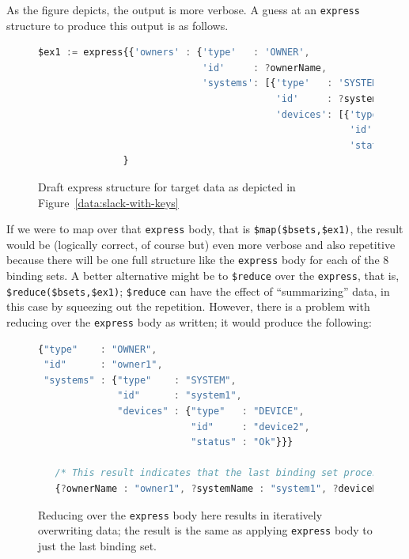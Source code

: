 \documentclass[9pt,letterpaper]{article}
\newcommand{\stt}[1]{\texttt{#1}} %
\begin{document}
As the figure depicts, the output is more verbose. %
A guess at an \stt{express} structure to produce this output is as follows.
\begin{figure}[H]
  \caption{Draft express structure for target data as depicted in Figure~\ref{data:slack-with-keys}}
 \label{code:slack-possible-express}
\begin{lstlisting}[language=JavaScript,basicstyle=\ttfamily\scriptsize,numberstyle=\scriptsize]
$ex1 := express{{'owners' : {'type'   : 'OWNER',
                             'id'     : ?ownerName,
                             'systems': [{'type'   : 'SYSTEM',
                                          'id'     : ?systemName,
                                          'devices': [{'type'  : 'DEVICE',
                                                       'id'    : ?deviceName,
                                                       'status': ?status}]}]}}
               }
\end{lstlisting}
\end{figure}  \vspace{-2em}

If we were to map over that \stt{express} body, that is \stt{\$map(\$bsets,\$ex1)}, the result would be (logically correct, of course but) even more verbose and also repetitive because there will be one full structure like the \stt{express} body for each of the 8 binding sets.
A better alternative might be to \stt{\$reduce} over the \stt{express}, that is, \stt{\$reduce(\$bsets,\$ex1)};
\stt{\$reduce} can have the effect of ``summarizing'' data, in this case by squeezing out the repetition.
However, there is a problem with reducing over the \stt{express} body as written;
it would produce the following:

\begin{figure}[H]
  \caption{Reducing over the \stt{express} body here results in iteratively overwriting data; the result is
    the same as applying \stt{express} body to just the last binding set.}
 \label{code:slack-result-wo-keys}
\begin{lstlisting}[language=JavaScript,basicstyle=\ttfamily\scriptsize,numberstyle=\scriptsize]
{"type"    : "OWNER",
 "id"      : "owner1",
 "systems" : {"type"    : "SYSTEM",
              "id"      : "system1",
              "devices" : {"type"   : "DEVICE",
                           "id"     : "device2",
                           "status" : "Ok"}}}

   /* This result indicates that the last binding set processed was the following */
   {?ownerName : "owner1", ?systemName : "system1", ?deviceName : "device2", ?status : "Ok", ?id : 200}
\end{lstlisting}
\end{figure}  \vspace{-2em}
\end{document}
